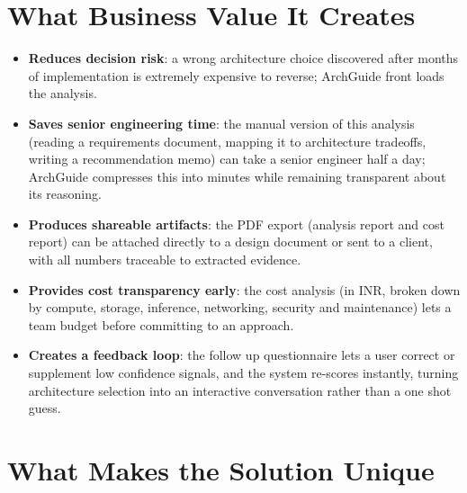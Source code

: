 \documentclass[11pt,a4paper]{report}
\begin{document}
\section{What Business Value It Creates}

\begin{itemize}[leftmargin=*]
  \item \textbf{Reduces decision risk}: a wrong architecture choice discovered after months of implementation is extremely expensive to reverse; ArchGuide front loads the analysis.
  \item \textbf{Saves senior engineering time}: the manual version of this analysis (reading a requirements document, mapping it to architecture tradeoffs, writing a recommendation memo) can take a senior engineer half a day; ArchGuide compresses this into minutes while remaining transparent about its reasoning.
  \item \textbf{Produces shareable artifacts}: the PDF export (analysis report and cost report) can be attached directly to a design document or sent to a client, with all numbers traceable to extracted evidence.
  \item \textbf{Provides cost transparency early}: the cost analysis (in INR, broken down by compute, storage, inference, networking, security and maintenance) lets a team budget before committing to an approach.
  \item \textbf{Creates a feedback loop}: the follow up questionnaire lets a user correct or supplement low confidence signals, and the system re-scores instantly, turning architecture selection into an interactive conversation rather than a one shot guess.
\end{itemize}

\section{What Makes the Solution Unique}
\end{document}
